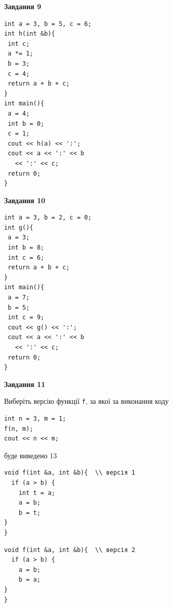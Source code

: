 \documentclass[12pt, ukrainian]{article}
\def\code#1{\Verb!#1!}
\begin{document}
{\begin {large}
\begin{minipage}[t]{11.0cm}
\end{minipage}


\begin{minipage}[t]{7.0cm}

\begin{center}
\textbf{Завдання 9}
\end{center}
\vspace{-8mm}

\begin{verbatim}
int a = 3, b = 5, c = 6;
int h(int &b){
 int c;
 a *= 1;
 b = 3;
 c = 4;
 return a + b + c;
}
int main(){
 a = 4;
 int b = 0;
 c = 1;
 cout << h(a) << ':';
 cout << a << ':' << b 
   << ':' << c;
 return 0;
}
\end{verbatim}



\begin{center}
\textbf{Завдання 10}
\end{center}
\vspace{-8mm}

\begin{verbatim}
int a = 3, b = 2, c = 0;
int g(){
 a = 3;
 int b = 8;
 int c = 6;
 return a + b + c;
}
int main(){
 a = 7;
 b = 5;
 int c = 9;
 cout << g() << ':';
 cout << a << ':' << b 
   << ':' << c;
 return 0;
}
\end{verbatim}

\end{minipage}
\vline \hspace{1mm}
\begin{minipage}[t]{11.0cm}

\begin{center}
\textbf{Завдання 11}
\end{center}
Виберіть версію функції \code{f}, за якої за виконання коду
\begin{verbatim}
int n = 3, m = 1;
f(n, m);
cout << n << m;
\end{verbatim}

буде виведено 13

\begin{verbatim}
void f(int &a, int &b){  \\ версія 1
  if (a > b) {
    int t = a;
    a = b;
    b = t;
}  
}
\end{verbatim}

\vspace{-8mm}\begin{verbatim}
void f(int &a, int &b){  \\ версія 2
  if (a > b) {
    a = b;
    b = a;
}  
}
\end{verbatim}


\end{minipage}
\end{large}}
\end{document}
